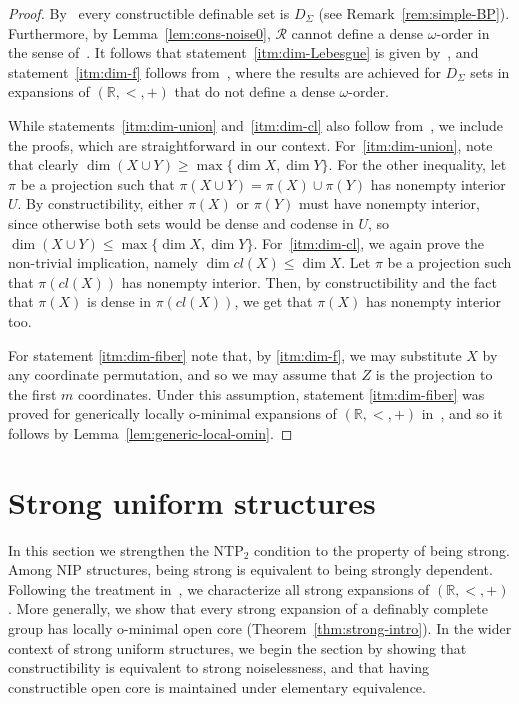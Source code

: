 \documentclass[12pt]{article}
\newcommand{\Rr}{\mathcal{R}}
\newcommand{\R}{\mathbb{R}}
\newcommand{\NIP}{\ensuremath{\mathrm{NIP}}}
\newcommand{\NTP}{\ensuremath{\mathrm{NTP}_2}}
\theoremstyle{definition}
\theoremstyle{remark}
\begin{document}
\begin{proof}
By~\cite[1.10]{DMS10} every constructible definable set is $D_\Sigma$ (see Remark~\ref{rem:simple-BP}). Furthermore, by Lemma~\ref{lem:cons-noise0}, $\Rr$ cannot define a dense $\omega$-order in the sense of~\cite{comp-set}. It follows that statement~\eqref{itm:dim-Lebesgue} is given by~\cite[Proposition 5.7]{comp-set}, and statement~\eqref{itm:dim-f} follows from~\cite[Theorem E]{comp-set}, where the results are achieved for $D_\Sigma$ sets in expansions of $(\R,<,+)$ that do not define a dense $\omega$-order. 

While statements~\eqref{itm:dim-union} and~\eqref{itm:dim-cl} also follow from~\cite{comp-set}, we include the proofs, which are straightforward in our context. For~\eqref{itm:dim-union}, note that clearly $\dim(X\cup Y) \geq \max\{ \dim X, \dim Y\}$. For the other inequality, let $\pi$ be a projection such that $\pi(X\cup Y)=\pi(X)\cup\pi(Y)$ has nonempty interior $U$. By constructibility, either $\pi(X)$ or $\pi(Y)$ must have nonempty interior, since otherwise both sets would be dense and codense in $U$, so $\dim(X\cup Y) \leq \max\{ \dim X, \dim Y\}$. For~\eqref{itm:dim-cl}, we again prove the non-trivial implication, namely $\dim cl(X) \leq \dim X$. Let $\pi$ be a projection such that $\pi(cl(X))$ has nonempty interior. Then, by constructibility and the fact that $\pi(X)$ is dense in $\pi(cl(X))$, we get that $\pi(X)$ has nonempty interior too. 

For statement \eqref{itm:dim-fiber} note that, by \eqref{itm:dim-f}, we may substitute $X$ by any coordinate permutation, and so we may assume that $Z$ is the projection to the first $m$ coordinates. Under this assumption, statement \eqref{itm:dim-fiber} was proved for generically locally o-minimal expansions of $(\R,<,+)$ in~\cite[Theorem 10.16]{wal22-preprint}, and so it follows by Lemma~\ref{lem:generic-local-omin}.
\end{proof}

\section{Strong uniform structures} \label{sec:strong}

In this section we strengthen the $\NTP$ condition to the property of being strong. Among $\NIP$ structures, being strong is equivalent to being strongly dependent. Following the treatment in~\cite{Wal22}, we characterize all strong expansions of $(\R,<,+)$. More generally, we show that every strong expansion of a definably complete group has locally o-minimal open core (Theorem~\ref{thm:strong-intro}). In the wider context of strong uniform structures, we begin the section by showing that constructibility is equivalent to strong noiselessness, and that having constructible open core is maintained under elementary equivalence. 
\end{document}
